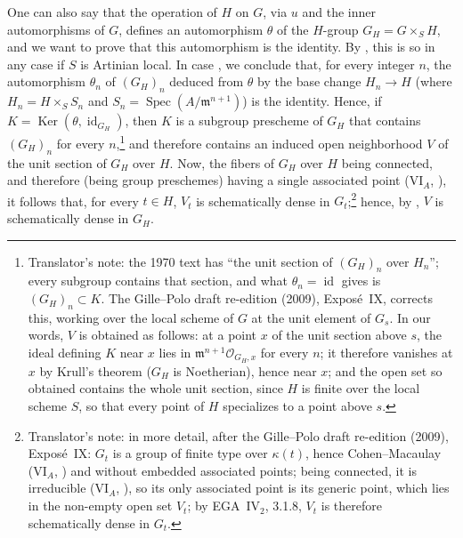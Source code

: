 One can also say that the operation of \(H\) on \(G\), via \(u\) and the
inner automorphisms of \(G\), defines an automorphism \(\theta\) of the
\(H\)-group \(G_H=G\times_SH\), and we want to prove that this
automorphism is the identity. By ,
this is so in any case if \(S\) is Artinian local. In case
, we conclude that, for every
integer \(n\), the automorphism \(\theta_n\) of \((G_H)_n\) deduced from
\(\theta\) by the base change \(H_n\to H\) (where \(H_n=H\times_SS_n\) and
\(S_n=\operatorname{Spec}(A/\mathfrak m^{n+1})\)) is the identity. Hence,
if \(K=\operatorname{Ker}(\theta,\operatorname{id}_{G_H})\), then \(K\) is
a subgroup prescheme of \(G_H\) that contains \((G_H)_n\) for every
\(n\),\footnote{Translator's note: the 1970 text has ``the unit section of
\((G_H)_n\) over \(H_n\)''; every subgroup contains that section, and what
\(\theta_n=\operatorname{id}\) gives is \((G_H)_n\subset K\). The
Gille--Polo draft re-edition (2009), Expos\'e~IX, corrects this, working
over the local scheme of \(G\) at the unit element of \(G_s\). In our
words, \(V\) is obtained as follows: at a point \(x\) of the unit section
above \(s\), the ideal defining \(K\) near \(x\) lies in
\(\mathfrak m^{n+1}\mathscr O_{G_H,x}\) for every \(n\); it therefore
vanishes at \(x\) by Krull's theorem (\(G_H\) is Noetherian), hence near
\(x\); and the open set so obtained contains the whole unit section,
since \(H\) is finite over the local scheme \(S\), so that every point of
\(H\) specializes to a point above \(s\).} and therefore contains an
induced open neighborhood \(V\) of the unit section of \(G_H\) over \(H\).
Now, the fibers of \(G_H\) over \(H\) being connected, and therefore
(being group preschemes) having a single associated point (VI\(_A\),
), it follows that, for every
\(t\in H\), \(V_t\) is schematically dense in \(G_t\);\footnote{Translator's
note: in more detail, after the Gille--Polo draft re-edition (2009),
Expos\'e~IX: \(G_t\) is a group of finite type over \(\kappa(t)\), hence
Cohen--Macaulay (VI\(_A\), ) and
without embedded associated points; being connected, it is irreducible
(VI\(_A\), ), so its only associated
point is its generic point, which lies in the non-empty open set \(V_t\);
by EGA~IV\(_2\), 3.1.8, \(V_t\) is therefore schematically dense in
\(G_t\).} hence, by
, \(V\) is schematically dense in
\(G_H\).

